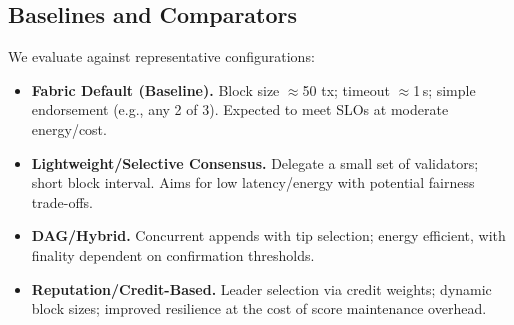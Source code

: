 \documentclass[12pt,onecolumn]{IEEEtran} %
\begin{document}
\subsection{Baselines and Comparators}
\label{subsec:baselines}

We evaluate against representative configurations:
\begin{itemize}
    \item \textbf{Fabric Default (Baseline).} Block size $\approx$50 tx; timeout $\approx$1\,s; simple endorsement (e.g., any 2 of 3). Expected to meet SLOs at moderate energy/cost.
    \item \textbf{Lightweight/Selective Consensus.} Delegate a small set of validators; short block interval. Aims for low latency/energy with potential fairness trade-offs.
    \item \textbf{DAG/Hybrid.} Concurrent appends with tip selection; energy efficient, with finality dependent on confirmation thresholds.
    \item \textbf{Reputation/Credit-Based.} Leader selection via credit weights; dynamic block sizes; improved resilience at the cost of score maintenance overhead.\cite{morais2023surveyonintegration}
\end{itemize}
\end{document}
